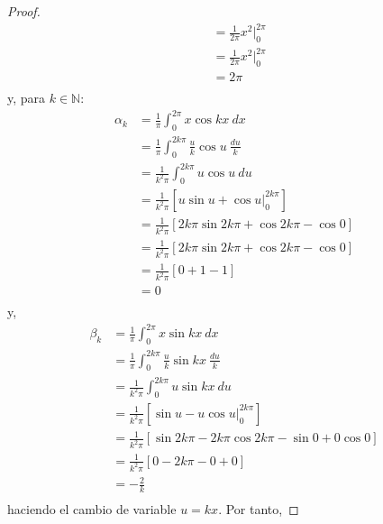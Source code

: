 \documentclass[12pt]{report}
\newcounter{it}
\theoremstyle{largebreak}
\begin{document}
\begin{proof}
\begin{equation*}
\begin{split}
                &=\frac{1}{2\pi} x^{2}\Big|_{0}^{2\pi}\\
                &=\frac{1}{2\pi} x^{2}\Big|_{0}^{2\pi}\\
                &=2\pi\\
            \end{split}
        \end{equation*}
        y, para $k\in\mathbb{N}$:
        \begin{equation*}
            \begin{split}
                \alpha_k&=\frac{1}{\pi}\int_{0}^{2\pi}x\cos kx\:dx\\
                &=\frac{1}{\pi}\int_{0}^{2k\pi}\frac{u}{k}\cos u\: \frac{du}{k}\\
                &=\frac{1}{k^2\pi}\int_{0}^{2k\pi}u\cos u\:du\\
                &=\frac{1}{k^2\pi}\left[u\sin u+\cos u\Big|_{0}^{2k\pi}\right]\\
                &=\frac{1}{k^2\pi}\left[2k\pi\sin 2k\pi+\cos 2k\pi-\cos0\right]\\
                &=\frac{1}{k^2\pi}\left[2k\pi\sin 2k\pi+\cos 2k\pi-\cos0\right]\\
                &=\frac{1}{k^2\pi}\left[0+1-1\right]\\
                &=0\\
            \end{split}
        \end{equation*}
        y,
        \begin{equation*}
            \begin{split}
                \beta_k&=\frac{1}{\pi}\int_{0}^{2\pi} x\sin kx\:dx\\
                &=\frac{1}{\pi}\int_{0}^{2k\pi} \frac{u}{k}\sin kx\:\frac{du}{k}\\
                &=\frac{1}{k^2\pi}\int_{0}^{2k\pi} u\sin kx\:du\\
                &=\frac{1}{k^2\pi}\left[\sin u-u\cos u\Big|_{0}^{2k\pi}\right]\\
                &=\frac{1}{k^2\pi}\left[\sin 2k\pi-2k\pi\cos 2k\pi-\sin 0+0\cos 0\right]\\
                &=\frac{1}{k^2\pi}\left[0-2k\pi-0+0\right]\\
                &=-\frac{2}{k}\\
            \end{split}
        \end{equation*}
        haciendo el cambio de variable $u=kx$. Por tanto,

\end{proof}
\end{document}
